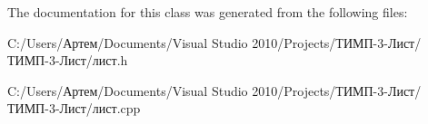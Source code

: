 The documentation for this class was generated from the following files\+:\begin{DoxyCompactItemize}
\item 
C\+:/\+Users/Артем/\+Documents/\+Visual Studio 2010/\+Projects/ТИМП-\/3-\/Лист/ТИМП-\/3-\/Лист/лист.\+h\item 
C\+:/\+Users/Артем/\+Documents/\+Visual Studio 2010/\+Projects/ТИМП-\/3-\/Лист/ТИМП-\/3-\/Лист/лист.\+cpp\end{DoxyCompactItemize}
